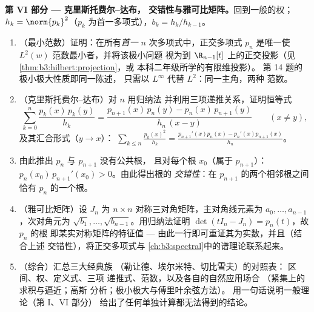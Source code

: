 \begin{problem}
\medskip
\noindent\textbf{第 VI 部分 --- 克里斯托费尔--达布，
交错性与雅可比矩阵。}回到一般的权；
$h_k = \norm{p_k}^2$（$p_k$ 为首一多项式），$b_k = h_k/h_{k-1}$。
\begin{enumerate}[resume]
  \item （最小范数）证明：在所有\emph{首一}
        $n$ 次多项式中，正交多项式 $p_n$
        是唯一使 $L^2(w)$ 范数最小者，并将该极小问题
        视为到
        $\R_{n-1}[t]$ 上的正交投影（见\cref{thm:b3:hilbert:projection}，或
        本科二年级所学的有限维投影）。
        第 14 题的极小极大性质即同一陈述，
        只需以 $L^\infty$ 代替 $L^2$：同一主角，两种
        范数。
  \item （克里斯托费尔--达布）对 $n$ 用归纳法
        并利用三项递推关系，证明恒等式
        \[
        \sum_{k=0}^{n}\frac{p_k(x)\,p_k(y)}{h_k}
        = \frac{p_{n+1}(x)\,p_n(y) -
        p_n(x)\,p_{n+1}(y)}{h_n\,(x - y)}
        \qquad (x \neq y),
        \]
        及其汇合形式（$y \to x$）：
        $\sum_{k\leq n}\frac{p_k(x)^2}{h_k} =
        \frac{p_{n+1}'(x)p_n(x) - p_n'(x)p_{n+1}(x)}{h_n}$。
  \item 由此推出 $p_n$ 与 $p_{n+1}$ 没有公共根，
        且对每个根 $x_0$（属于 $p_{n+1}$）：
        $p_n(x_0)\,p_{n+1}'(x_0) > 0$。由此得出根的
        \emph{交错性}：在 $p_{n+1}$ 的两个相邻根之间
        恰有 $p_n$ 的一个根。
  \item （雅可比矩阵）设 $J_n$ 为 $n\times n$
        对称三对角矩阵，主对角线元素为 $a_0,
        \dots, a_{n-1}$，次对角元为 $\sqrt{b_1},
        \dots, \sqrt{b_{n-1}}$。用归纳法证明
        $\det(tI_n - J_n) = p_n(t)$，故 $p_n$ 的根
        即某实对称矩阵的特征值 ---
        由此一行即可重证其为实数，并且（结合上述
        交错性），将正交多项式与
        \cref{ch:b3:spectral}中的谱理论联系起来。
  \item （综合）汇总三大经典族
        （勒让德、埃尔米特、切比雪夫）的对照表：
        区间、权、定义式、三项
        递推式、范数，以及各自的自然应用场合
        （紧集上的求积与逼近；高斯
        分析；极小极大与傅里叶余弦方法）。
        用一句话说明一般理论（第 I、VI 部分）
        给出了任何单独计算都无法得到的结论。
\end{enumerate}


\end{problem}
